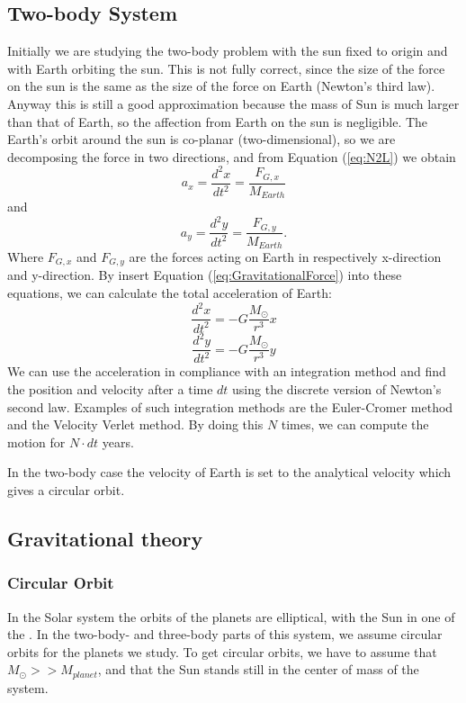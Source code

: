 \documentclass[norsk,a4paper,12pt]{article}
\begin{document}
\subsection{Two-body System}
Initially we are studying the two-body problem with the sun fixed to origin and with Earth orbiting the sun. This is not fully correct, since the size of the force on the sun is the same as the size of the force on Earth (Newton's third law). Anyway this is still a good approximation because the mass of Sun is much larger than that of Earth, so the affection from Earth on the sun is negligible. The Earth's orbit around the sun is co-planar (two-dimensional), so we are decomposing the force in two directions, and from Equation (\ref{eq:N2L}) we obtain
\begin{equation}
a_x=\frac{d^2x}{dt^2}=\frac{F_{G,x}}{M_{Earth}}
\end{equation}
and
\begin{equation}
a_y=\frac{d^2y}{dt^2}=\frac{F_{G,y}}{M_{Earth}}.
\end{equation}
Where $F_{G,x}$ and $F_{G,y}$ are the forces acting on Earth in respectively x-direction and y-direction. By insert Equation (\ref{eq:GravitationalForce}) into these equations, we can calculate the total acceleration of Earth:
\begin{equation}
\frac{d^2x}{dt^2}=-G\frac{M_\odot}{r^3}x
\end{equation}
\begin{equation}
\frac{d^2y}{dt^2}=-G\frac{M_\odot}{r^3}y
\end{equation}
We can use the acceleration in compliance with an integration method and find the position and velocity after a time $dt$ using the discrete version of Newton's second law. Examples of such integration methods are the Euler-Cromer method and the Velocity Verlet method. By doing this $N$ times, we can compute the motion for $N\cdot dt$ years. 

In the two-body case the velocity of Earth is set to the analytical velocity which gives a circular orbit. 
 
\subsection{Gravitational theory}
\subsubsection{Circular Orbit}
In the Solar system the orbits of the planets are elliptical, with the Sun in one of the \cite{kepler}. In the two-body- and three-body parts of this system, we assume circular orbits for the planets we study. To get circular orbits, we have to assume that $M_{\odot} >> M_{planet}$, and that the Sun stands still in the center of mass of the system. \par
\vspace{3mm}
\end{document}
